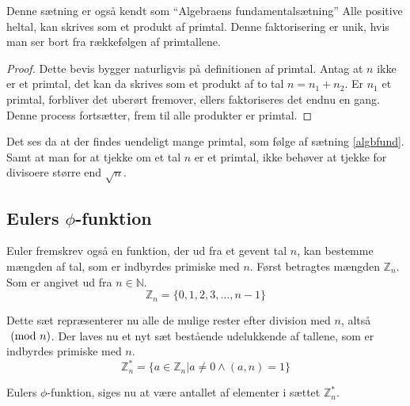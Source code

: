 %



\begin{sent}%
    Denne sætning er også kendt som ``Algebraens fundamentalsætning''
    Alle positive heltal, kan skrives som et produkt af primtal.
    Denne faktorisering er unik, hvis man ser bort fra rækkefølgen af primtallene.
    \label{algbfund}
\end{sent}

\begin{proof}
    Dette bevis bygger naturligvis på definitionen af primtal.
    Antag at \(n\) ikke er et primtal, det kan da skrives som et produkt af to tal \(n = n_1 + n_2\).
    Er \(n_1\) et primtal, forbliver det uberørt fremover, ellers faktoriseres det endnu en gang.
    Denne process fortsætter, frem til alle produkter er primtal.
\end{proof}

Det ses da at der findes uendeligt mange primtal, som følge af sætning \ref{algbfund}.
Samt at man for at tjekke om et tal \(n\) er et primtal, ikke behøver at tjekke for divisoere større end \(\sqrt{n}\).


\subsection{Eulers \texorpdfstring{\(\phi\)}{Lg}-funktion}
Euler fremskrev også en funktion, der ud fra et gevent tal \(n\), kan bestemme mængden af tal, som er indbyrdes primiske med \(n\).
Først betragtes mængden \(\mathbb{Z}_n\). Som er angivet ud fra \(n \in \mathbb{N}\).
\[\mathbb{Z}_n = \{0, 1, 2, 3, \hdots, n-1 \}\]

Dette sæt repræsenterer nu alle de mulige rester efter division med \(n\), altså \(\ (\mathrm{mod}\ n)\).
Der laves nu et nyt sæt bestående udelukkende af tallene, som er indbyrdes primiske med \(n\).
\[\mathbb{Z}_n^* = \{a \in \mathbb{Z}_n | a \neq 0 \land (a, n) = 1\}\]

\begin{definition}
    Eulers \(\phi\)-funktion, siges nu at være antallet af elementer i sættet \(\mathbb{Z}_n^*\).
\end{definition}

